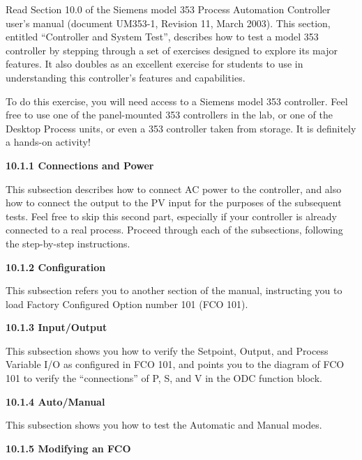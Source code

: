 

Read Section 10.0 of the Siemens model 353 Process Automation Controller user's manual (document UM353-1, Revision 11, March 2003).  This section, entitled ``Controller and System Test'', describes how to test a model 353 controller by stepping through a set of exercises designed to explore its major features.  It also doubles as an excellent exercise for students to use in understanding this controller's features and capabilities.

To do this exercise, you will need access to a Siemens model 353 controller.  Feel free to use one of the panel-mounted 353 controllers in the lab, or one of the Desktop Process units, or even a 353 controller taken from storage.  It is definitely a hands-on activity!

\vskip 10pt

\noindent
{\bf 10.1.1 Connections and Power}

This subsection describes how to connect AC power to the controller, and also how to connect the output to the PV input for the purposes of the subsequent tests.  Feel free to skip this second part, especially if your controller is already connected to a real process.  Proceed through each of the subsections, following the step-by-step instructions.

\vskip 30pt

\noindent
{\bf 10.1.2 Configuration}

This subsection refers you to another section of the manual, instructing you to load Factory Configured Option number 101 (FCO 101).

\vskip 30pt

\noindent
{\bf 10.1.3 Input/Output}

This subsection shows you how to verify the Setpoint, Output, and Process Variable I/O as configured in FCO 101, and points you to the diagram of FCO 101 to verify the ``connections'' of P, S, and V in the ODC function block.

\vskip 30pt

\noindent
{\bf 10.1.4 Auto/Manual}

This subsection shows you how to test the Automatic and Manual modes.

\vskip 30pt

\noindent
{\bf 10.1.5 Modifying an FCO}

